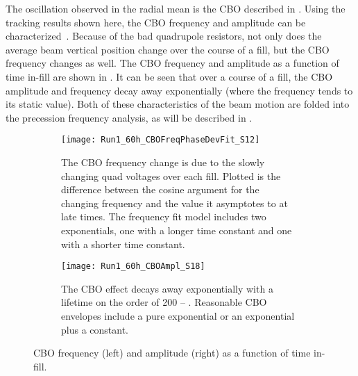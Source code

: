 The oscillation observed in the radial mean is the CBO described in . Using the tracking results shown here, the CBO frequency and amplitude can be characterized~\cite{cbofrequency}.  Because of the bad quadrupole resistors, not only does the average beam vertical position change over the course of a fill, but the CBO frequency changes as well. The CBO frequency and amplitude as a function of time in-fill are shown in . It can be seen that over a course of a fill, the CBO amplitude and frequency decay away exponentially (where the frequency tends to its static value). Both of these characteristics of the beam motion are folded into the precession frequency analysis, as will be described in .



\begin{figure}
\centering
    \begin{subfigure}[t]{0.47\textwidth}
        \centering
        \texttt{[image: Run1\_60h\_CBOFreqPhaseDevFit\_S12]}
        \caption{The CBO frequency change is due to the slowly changing quad voltages over each fill. Plotted is the difference between the cosine argument for the changing frequency and the value it asymptotes to at late times. The frequency fit model includes two exponentials, one with a longer time constant and one with a shorter time constant.}
    \end{subfigure}
    \hspace{1mm}
    \begin{subfigure}[t]{0.47\textwidth}
        \centering
        \texttt{[image: Run1\_60h\_CBOAmpl\_S18]}
        \caption{The CBO effect decays away exponentially with a lifetime on the order of \SI{200}{} -- . Reasonable CBO envelopes include a pure exponential or an exponential plus a constant.}
    \end{subfigure}
\caption[CBO frequency and amplitude as a function of time in-fill]{CBO frequency (left) and amplitude (right) as a function of time in-fill.}
\label{fig:CBOFreqAmp}
\end{figure}





